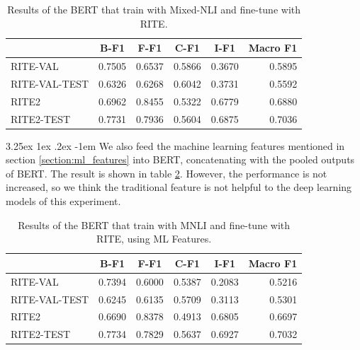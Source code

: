 \documentclass[12pt]{article}
\makeatletter
\renewcommand\paragraph{\@startsection{paragraph}{5}{\z@}%
  {3.25ex \@plus1ex \@minus.2ex}%
  {-1em}%
  {\normalfont\normalsize\bfseries}}
\makeatother
\begin{document}
\begin{CJK*}{UTF8}{bkai}
\begin{spacing}{1.77}
\begin{table}[H]
  \centering
  \setlength{\extrarowheight}{-3pt}
  \begin{tabular}{|l|r|r|r|r|r|}
  \hline
   & \multicolumn{1}{c|}{B-F1} & \multicolumn{1}{c|}{F-F1} & \multicolumn{1}{c|}{C-F1} & \multicolumn{1}{c|}{I-F1} & \multicolumn{1}{c|}{Macro F1} \\ \hline
  RITE-VAL & 0.7505 & 0.6537 & 0.5866 & 0.3670 & 0.5895 \\ \hline
  RITE-VAL-TEST & 0.6326 & 0.6268 & 0.6042 & 0.3731 & 0.5592 \\ \hline
  RITE2 & 0.6962 & 0.8455 & 0.5322 & 0.6779 & 0.6880 \\ \hline
  RITE2-TEST & 0.7731 & 0.7936 & 0.5604 & 0.6875 & 0.7036 \\ \hline
  \end{tabular}
  \caption{Results of the BERT that train with Mixed-NLI and fine-tune with RITE.}
  \label{result:bert_mixed_nli}
\end{table}

\paragraph{}
We also feed the machine learning features mentioned in section \ref{section:ml_features} into BERT, concatenating with the pooled outputs of BERT. The result is shown in table \ref{result:bert_mnli_ft}. However, the performance is not increased, so we think the traditional feature is not helpful to the deep learning models of this experiment.

\begin{table}[H]
  \centering
  \setlength{\extrarowheight}{-3pt}
  \begin{tabular}{|l|r|r|r|r|r|}
  \hline
   & \multicolumn{1}{c|}{B-F1} & \multicolumn{1}{c|}{F-F1} & \multicolumn{1}{c|}{C-F1} & \multicolumn{1}{c|}{I-F1} & \multicolumn{1}{c|}{Macro F1} \\ \hline
  RITE-VAL & 0.7394 & 0.6000 & 0.5387 & 0.2083 & 0.5216 \\ \hline
  RITE-VAL-TEST & 0.6245 & 0.6135 & 0.5709 & 0.3113 & 0.5301 \\ \hline
  RITE2 & 0.6690 & 0.8378 & 0.4913 & 0.6805 & 0.6697 \\ \hline
  RITE2-TEST & 0.7734 & 0.7829 & 0.5637 & 0.6927 & 0.7032 \\ \hline
  \end{tabular}
  \caption{Results of the BERT that train with MNLI and fine-tune with RITE, using ML Features.}
  \label{result:bert_mnli_ft}
\end{table}


\end{spacing}
\end{CJK*}
\end{document}
